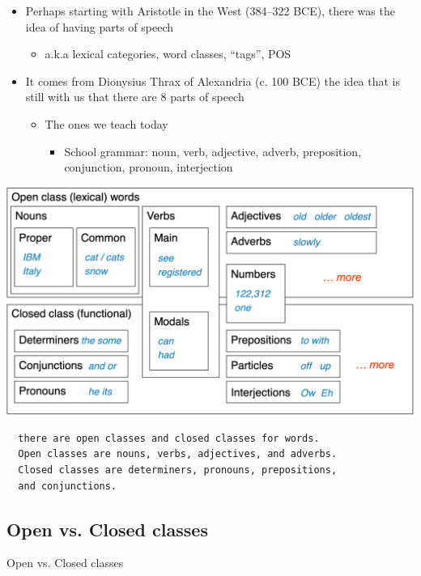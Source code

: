 \documentclass[11pt]{article}
\theoremstyle{definition}
\begin{document}
\begin{itemize}
  \item Perhaps starting with Aristotle in the West (384–322 BCE), there
  was the idea of having parts of speech
  \begin{itemize}
    \item a.k.a lexical categories, word classes, “tags”, POS
  \end{itemize}
  \item It comes from Dionysius Thrax of Alexandria (c. 100 BCE) the
  idea that is still with us that there are 8 parts of speech
  \begin{itemize}
    \item The ones we teach today
    \begin{itemize}
      \item School grammar: noun, verb, adjective, adverb, preposition,
      conjunction, pronoun, interjection
    \end{itemize}
  \end{itemize}
\end{itemize}

\includegraphics[width=\textwidth/2]{1.png}

\begin{verbatim}
  there are open classes and closed classes for words. 
  Open classes are nouns, verbs, adjectives, and adverbs.
  Closed classes are determiners, pronouns, prepositions, 
  and conjunctions.
\end{verbatim}

\subsection{Open vs. Closed classes}
Open vs. Closed classes
\end{document}
